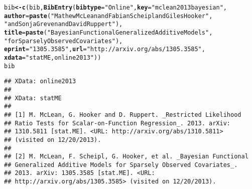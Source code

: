 \documentclass[article]{jss}\usepackage[]{graphicx}\usepackage[]{color}
\makeatletter
\newcommand{\hlstr}[1]{\textcolor[rgb]{0.125,0.125,1}{#1}}%
\newcommand{\hlstd}[1]{\textcolor[rgb]{0.251,0.251,0.282}{#1}}%
\newcommand{\hlkwb}[1]{\textcolor[rgb]{0.439,0.251,1}{\textbf{#1}}}%
\newcommand{\hlkwc}[1]{\textcolor[rgb]{0.529,0,0.184}{\textbf{#1}}}%
\newcommand{\hlkwd}[1]{\textcolor[rgb]{0.251,0.251,0.282}{\textbf{#1}}}%
\newenvironment{kframe}{%
 \def\at@end@of@kframe{}%
 \ifinner\ifhmode%
  \def\at@end@of@kframe{\end{minipage}}%
  \begin{minipage}{\columnwidth}%
 \fi\fi%
 \def\FrameCommand##1{\hskip\@totalleftmargin \hskip-\fboxsep
 \colorbox{shadecolor}{##1}\hskip-\fboxsep
     \hskip-\linewidth \hskip-\@totalleftmargin \hskip\columnwidth}%
 \MakeFramed {\advance\hsize-\width
   \@totalleftmargin\z@ \linewidth\hsize
   \@setminipage}}%
 {\par\unskip\endMakeFramed%
 \at@end@of@kframe}
\newenvironment{knitrout}{}{} %
\makeatother
\begin{document}
\begin{knitrout}
\begin{kframe}
\begin{alltt}
\hlstd{bib} \hlkwb{<-} \hlkwd{c}\hlstd{(bib,} \hlkwd{BibEntry}\hlstd{(}\hlkwc{bibtype}\hlstd{=}\hlstr{"Online"}\hlstd{,} \hlkwc{key}\hlstd{=}\hlstr{"mclean2013bayesian"}\hlstd{,}
  \hlkwc{author} \hlstd{=} \hlkwd{paste}\hlstd{(}\hlstr{"Mathew McLean and Fabian Scheipl and Giles Hooker"}\hlstd{,}
                \hlstr{"and Sonja Greven and David Ruppert"}\hlstd{),}
  \hlkwc{title} \hlstd{=} \hlkwd{paste}\hlstd{(}\hlstr{"Bayesian Functional Generalized Additive Models"}\hlstd{,}
               \hlstr{"for Sparsely Observed Covariates"}\hlstd{),}
  \hlkwc{eprint} \hlstd{=} \hlstr{"1305.3585"}\hlstd{,} \hlkwc{url} \hlstd{=} \hlstr{"http://arxiv.org/abs/1305.3585"}\hlstd{,}
  \hlkwc{xdata} \hlstd{=} \hlstr{"statME,online2013"}\hlstd{))}
\hlstd{bib}
\end{alltt}
\begin{verbatim}
## XData: online2013
## 
## XData: statME
## 
## [1] M. McLean, G. Hooker and D. Ruppert. _Restricted Likelihood
## Ratio Tests for Scalar-on-Function Regression_. 2013. arXiv:
## 1310.5811 [stat.ME]. <URL: http://arxiv.org/abs/1310.5811>
## (visited on 12/20/2013).
## 
## [2] M. McLean, F. Scheipl, G. Hooker, et al. _Bayesian Functional
## Generalized Additive Models for Sparsely Observed Covariates_.
## 2013. arXiv: 1305.3585 [stat.ME]. <URL:
## http://arxiv.org/abs/1305.3585> (visited on 12/20/2013).
\end{verbatim}
\end{kframe}
\end{knitrout}
\end{document}
